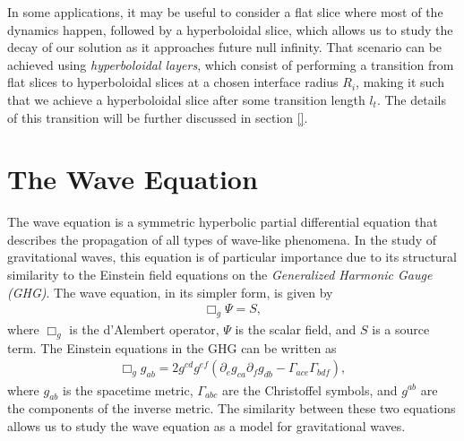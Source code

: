 In some applications, it may be useful to consider a flat slice where most of the dynamics happen, followed by a hyperboloidal slice, which allows us to study the decay of our solution as it approaches future null infinity. That scenario can be achieved using \textit{hyperboloidal layers}, which consist of performing a transition from flat slices to hyperboloidal slices at a chosen interface radius $R_i$, making it such that we achieve a hyperboloidal slice after some transition length $l_t$. The details of this transition will be further discussed in section \ref{}.


\section{The Wave Equation}
\label{section:wave_equation}

The wave equation is a symmetric hyperbolic partial differential equation that describes the propagation of all types of wave-like phenomena. In the study of gravitational waves, this equation is of particular importance due to its structural similarity to the Einstein field equations on the \textit{Generalized Harmonic Gauge (GHG)}. The wave equation, in its simpler form, is given by
%
\begin{align}
    \Box_g \Psi = S,
    \label{eq:wave_equation_simple}
\end{align}
%
where $\Box_g$ is the d'Alembert operator, $\Psi$ is the scalar field, and $S$ is a source term. The Einstein equations in the GHG can be written as
%
\begin{align}
    \Box_g g_{ab} = 2 g^{cd} g^{ef} (\partial_e g_{ca} \partial_f g_{db} - \Gamma_{ace} \Gamma_{bdf}),
\end{align}
%
where $g_{ab}$ is the spacetime metric, $\Gamma_{abc}$ are the Christoffel symbols, and $g^{ab}$ are the components of the inverse metric. The similarity between these two equations allows us to study the wave equation as a model for gravitational waves.

